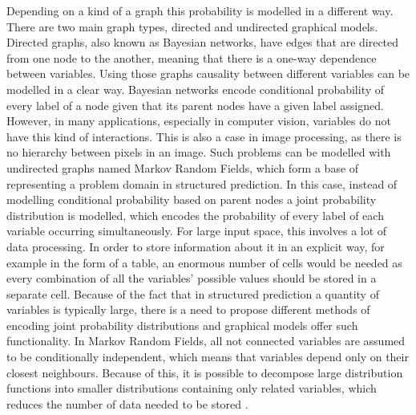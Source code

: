 Depending on a kind of a graph this probability is modelled in a different way. There are two main graph types, directed and undirected graphical models. Directed graphs, also known as Bayesian networks, have edges that are directed from one node to the another, meaning that there is a one-way dependence between variables. Using those graphs causality between different variables can be modelled in a clear way. Bayesian networks encode conditional probability of every label of a node given that its parent nodes have a given label assigned.  However, in many applications, especially in computer vision, variables do not have this kind of interactions. This is also a case in image processing, as there is no hierarchy between pixels in an image. Such problems can be modelled with undirected graphs named Markov Random Fields, which form a base of representing a problem domain in structured prediction. In this case,  instead of modelling conditional probability based on parent nodes a joint probability distribution is modelled, which encodes the probability of every label of each variable occurring simultaneously. For large input space, this involves a lot of data processing. In order to store information about it in an explicit way, for example in the form of a table, an enormous number of cells would be needed as every combination of all the variables’ possible values should be stored in a separate cell. Because of the fact that in structured prediction a quantity of variables is typically large, there is a need to propose different methods of encoding joint probability distributions and graphical models offer such functionality. In Markov Random Fields, all not connected variables are assumed to be conditionally independent, which means that variables depend only on their closest neighbours. Because of this, it is possible to decompose large distribution functions into smaller distributions containing only related variables, which reduces the number of data needed to be stored \cite{causality_pearl}. 
